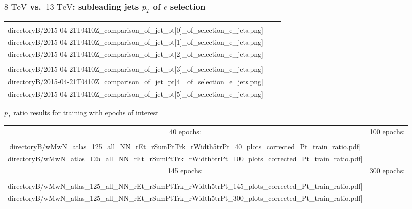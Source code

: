 \begin{frame}
\frametitle{${8\textrm{ TeV}}$ vs.~${13\textrm{ TeV}}$: subleading jets ${p_{T}}$ of ${e}$ selection}
\begin{center}
\begin{tabular}{ccc}
\texttt{[image: \\directoryB/2015-04-21T0410Z\_comparison\_of\_jet\_pt[0]\_of\_selection\_e\_jets.png]}&\texttt{[image: \\directoryB/2015-04-21T0410Z\_comparison\_of\_jet\_pt[1]\_of\_selection\_e\_jets.png]}&\texttt{[image: \\directoryB/2015-04-21T0410Z\_comparison\_of\_jet\_pt[2]\_of\_selection\_e\_jets.png]}\\
\texttt{[image: \\directoryB/2015-04-21T0410Z\_comparison\_of\_jet\_pt[3]\_of\_selection\_e\_jets.png]}&\texttt{[image: \\directoryB/2015-04-21T0410Z\_comparison\_of\_jet\_pt[4]\_of\_selection\_e\_jets.png]}&\texttt{[image: \\directoryB/2015-04-21T0410Z\_comparison\_of\_jet\_pt[5]\_of\_selection\_e\_jets.png]}\\
\end{tabular}
\end{center}
\end{frame}

\begin{frame}{${p_{T}}$ ratio results for training with epochs of interest}
\begin{table}[h]
\begin{tabular}{cc}
40 epochs:&100 epochs:
\\
\texttt{[image: \\directoryB/wMwN\_atlas\_125\_all\_NN\_rEt\_rSumPtTrk\_rWidth5trPt\_40\_plots\_corrected\_Pt\_train\_ratio.pdf]}
&
\texttt{[image: \\directoryB/wMwN\_atlas\_125\_all\_NN\_rEt\_rSumPtTrk\_rWidth5trPt\_100\_plots\_corrected\_Pt\_train\_ratio.pdf]}
\\
145 epochs:&300 epochs:
\\
\texttt{[image: \\directoryB/wMwN\_atlas\_125\_all\_NN\_rEt\_rSumPtTrk\_rWidth5trPt\_145\_plots\_corrected\_Pt\_train\_ratio.pdf]}
&
\texttt{[image: \\directoryB/wMwN\_atlas\_125\_all\_NN\_rEt\_rSumPtTrk\_rWidth5trPt\_300\_plots\_corrected\_Pt\_train\_ratio.pdf]}
\\
\end{tabular}
\end{table}
\end{frame}

